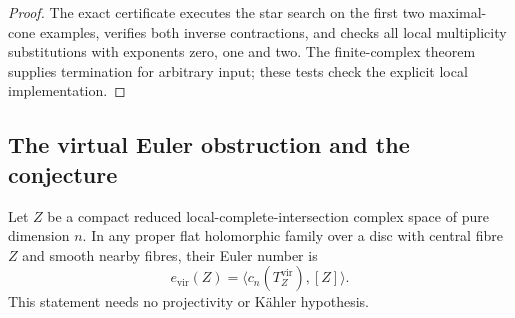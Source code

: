 \begin{proof}
The exact certificate
executes the star search on the first two
maximal-cone examples, verifies both inverse
contractions, and checks all local multiplicity
substitutions with exponents zero, one and two.
The finite-complex theorem supplies termination for
arbitrary input; these tests check the explicit
local implementation.
\end{proof}


\subsection{The virtual Euler obstruction and the conjecture}\label{push:section:A.3}

\begin{lemma}\label{push:src:A.3.1}\label{push:A31}
Let $Z$ be a compact reduced local-complete-intersection complex
space of pure dimension $n$. In any proper flat holomorphic
family over a disc with central fibre $Z$ and smooth nearby
fibres, their Euler number is
\[
 e_{\mathrm{vir}}(Z)=\langle c_n(T_Z^{\mathrm{vir}}),[Z]\rangle.
\]
This statement needs no projectivity or K\"ahler hypothesis.
\end{lemma}

